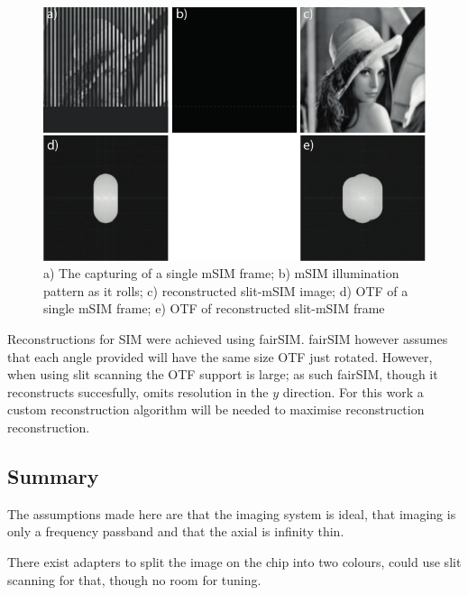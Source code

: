 \begin{figure}
  \centering
  \includegraphics{msim_slit}
  \caption{
  a) The capturing of a single mSIM frame;
  b) mSIM illumination pattern as it rolls;
  c) reconstructed slit-mSIM image;
  d) OTF of a single mSIM frame;
  e) OTF of reconstructed slit-mSIM frame
  }
  \label{}
\end{figure}


Reconstructions for SIM were achieved using fairSIM.
fairSIM however assumes that each angle provided will have the same size OTF just rotated.
However, when using slit scanning the OTF support is large; as such fairSIM, though it reconstructs succesfully, omits resolution in the $y$ direction.
For this work a custom reconstruction algorithm will be needed to maximise reconstruction reconstruction.

\subsection{Summary}

The assumptions made here are that the imaging system is ideal, that imaging is only a frequency passband and that the axial is infinity thin.

There exist adapters to split the image on the chip into two colours, could use slit scanning for that, though no room for tuning.
